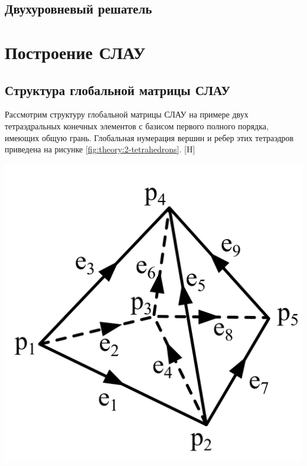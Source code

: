 \documentclass[a4paper,14pt]{article}
\makeatletter
\renewenvironment{figure}[1][\fps@figure]{
  \edef\@tempa{\noexpand\@float{figure}[#1]}
  \@tempa
  \addtocounter{foofigure}{1}
}{
  \end@float
}
\makeatother
\begin{document}

\subsection{Двухуровневый решатель}


\clearpage
\section{Построение СЛАУ}
\subsection{Структура глобальной матрицы СЛАУ}
Рассмотрим структуру глобальной матрицы СЛАУ на примере двух тетраэдральных конечных элементов с базисом первого полного порядка, имеющих общую грань. Глобальная нумерация вершин и ребер этих тетраэдров приведена на рисунке \ref{fig:theory:2-tetrahedrons}.
\begin{figure}[H]
	\centering
	\includegraphics[scale=0.25]{theory/2-tetrahedrons.png}
	\caption{два тетраэдральных конечных элемента}
	\label{fig:theory:2-tetrahedrons}
\end{figure}
\end{document}
